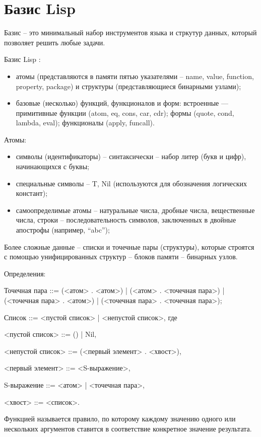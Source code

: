 \documentclass[12pt]{report}
\begin{document}
\section*{Базис Lisp}
	
Базис -- это минимальный набор инструментов языка и стркутур данных, который позволяет решить любые задачи.


Базис Lisp :

\begin{itemize}
	\item атомы (представляются в памяти пятью указателями  --  name, value, function, property, package) и структуры (представляющиеся бинарными узлами);
	\item базовые (несколько) функций, функционалов и форм: встроенные — примитивные функции (atom, eq, cons, car, cdr); формы (quote, cond, lambda, eval); функционалы (apply, funcall).
\end{itemize}

Атомы:
\begin{itemize} 
	\item символы (идентификаторы) – синтаксически – набор литер (букв и цифр), начинающихся с буквы;
	\item специальные символы – {T, Nil} (используются для обозначения логических констант);
	\item самоопределимые атомы – натуральные числа, дробные числа, вещественные числа, строки – последовательность символов, заключенных в двойные апострофы (например, “abc”);
\end{itemize} 

Более сложные данные – списки и точечные пары (структуры), которые строятся с помощью унифицированных структур – блоков памяти – бинарных узлов.

Определения:

Точечная пара ::= (<атом> . <атом>) | (<атом> . <точечная пара>) | (<точечная пара> . <атом>) | (<точечная пара> . <точечная пара>);

Список ::= <пустой список> | <непустой список>, где 

<пустой список> ::= () | Nil,

<непустой список> ::= (<первый элемент> . <хвост>),

<первый элемент> ::= <S-выражение>,

S-выражение ::= <атом> | <точечная пара>,

<хвост> ::= <список>.


Функцией называется правило, по которому каждому значению одного или нескольких  аргументов ставится в соответствие конкретное значение результата. 
\end{document}
